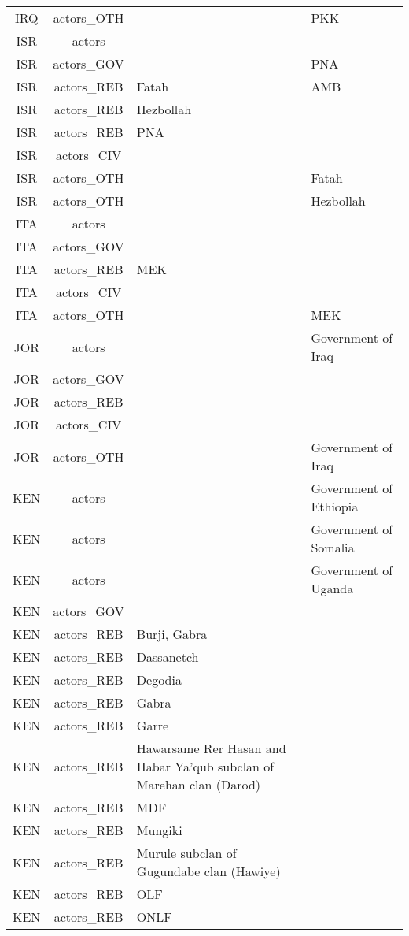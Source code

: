 \documentclass[12pt]{article}
\begin{document}
\begin{center}
\begin{longtable}{|c|c|p{7cm}|p{7cm}|}
  IRQ & actors\_OTH &  & PKK \\ 
  ISR & actors &  &  \\ 
  ISR & actors\_GOV &  & PNA \\ 
  ISR & actors\_REB & Fatah & AMB \\ 
  ISR & actors\_REB & Hezbollah &  \\ 
  ISR & actors\_REB & PNA &  \\ 
  ISR & actors\_CIV &  &  \\ 
  ISR & actors\_OTH &  & Fatah \\ 
  ISR & actors\_OTH &  & Hezbollah \\ 
  ITA & actors &  &  \\ 
  ITA & actors\_GOV &  &  \\ 
  ITA & actors\_REB & MEK &  \\ 
  ITA & actors\_CIV &  &  \\ 
  ITA & actors\_OTH &  & MEK \\ 
  JOR & actors &  & Government of Iraq \\ 
  JOR & actors\_GOV &  &  \\ 
  JOR & actors\_REB &  &  \\ 
  JOR & actors\_CIV &  &  \\ 
  JOR & actors\_OTH &  & Government of Iraq \\ 
  KEN & actors &  & Government of Ethiopia \\ 
  KEN & actors &  & Government of Somalia \\ 
  KEN & actors &  & Government of Uganda \\ 
  KEN & actors\_GOV &  &  \\ 
  KEN & actors\_REB & Burji, Gabra &  \\ 
  KEN & actors\_REB & Dassanetch &  \\ 
  KEN & actors\_REB & Degodia &  \\ 
  KEN & actors\_REB & Gabra &  \\ 
  KEN & actors\_REB & Garre &  \\ 
  KEN & actors\_REB & Hawarsame Rer Hasan and Habar Ya'qub subclan of Marehan clan (Darod) &  \\ 
  KEN & actors\_REB & MDF &  \\ 
  KEN & actors\_REB & Mungiki &  \\ 
  KEN & actors\_REB & Murule subclan of Gugundabe clan (Hawiye) &  \\ 
  KEN & actors\_REB & OLF &  \\ 
  KEN & actors\_REB & ONLF &  \\ 

\end{longtable}
\end{center}
\end{document}
